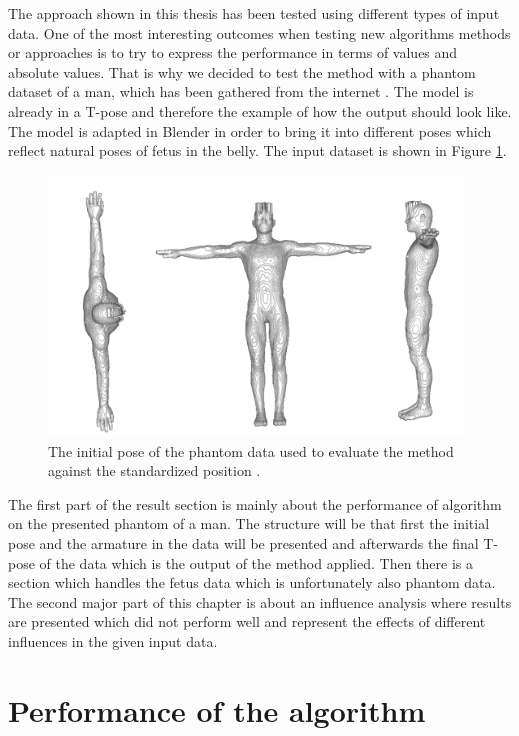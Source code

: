 The approach shown in this thesis has been tested using different types of input data. One of the most interesting outcomes when testing new algorithms methods or approaches is to try to express the performance in terms of values and absolute values. That is why we decided to test the method with a phantom dataset of a man, which has been gathered from the internet \cite{Squidifier2010DetailedMan}. The model is already in a T-pose and therefore the example of how the output should look like. The model is adapted in Blender in order to bring it into different poses which reflect natural poses of fetus in the belly. The input dataset is shown in Figure \ref{fig:tPose}.

\begin{figure} [htb!]
    \centering
	\includegraphics[width=11cm]{content/images/results/TPosition.png}
	\caption{The initial pose of the phantom data used to evaluate the method against the standardized position \cite{Squidifier2010DetailedMan}.}
	\label{fig:tPose}
\end{figure}

The first part of the result section is mainly about the performance of algorithm on the presented phantom of a man. The structure will be that first the initial pose and the armature in the data will be presented and afterwards the final T-pose of the data which is the output of the method applied. Then there is a section which handles the fetus data which is unfortunately also phantom data. The second major part of this chapter is about an influence analysis where results are presented which did not perform well and represent the effects of different influences in the given input data.

\newpage
\section{Performance of the algorithm}

